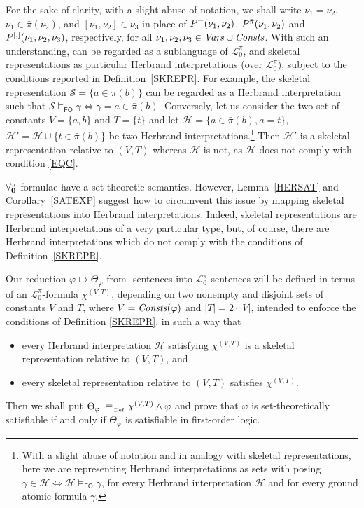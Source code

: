 \documentclass[a4paper]{llncs}
\newcommand{\Elpizero}{\ensuremath{\mathcal{L}_{0}^{\pi}}\xspace}
\newcommand{\nonpairssym}{\bar{\pi}}
\newcommand{\nonpairs}[1]{\nonpairssym(#1)}
\newcommand{\nonpairin}[2]{#1 \in \bar{\pi}(#2)}
\newcommand{\seteq}[2]{#1=#2}
\newcommand{\atset}{\mathcal{S}}
\newcommand{\consta}{a}
\newcommand{\constb}{b}
\newcommand{\hinter}{\ensuremath{\mathcal{H}}}
\newcommand{\fomodels}[2]{#1 \models_{\mathsf{FO}} #2}
\begin{document}
For the sake of clarity, with a slight abuse of notation, we shall
write $\nu_1=\nu_2$, $\nu_1 \in \nonpairs{\nu_2}$, and $[\nu_1, \nu_2]
\in \nu_3$ in place of $P^{=}(\nu_1, \nu_2)$, $P^{\bar{\pi}}(\nu_1,
\nu_2)$ and $P^{[,]}(\nu_1, \nu_2, \nu_3)$, respectively, for all
$\nu_1,\nu_2,\nu_3 \in \mathit{Vars} \cup \mathit{Consts}$.  With such an
understanding, \Forallpizero can be regarded as a sublanguage of
$\Elpizero$, and skeletal representations as particular Herbrand 
interpretations (over \Elpizero), subject to the conditions reported 
in Definition~\ref{SKREPR}. For example, the skeletal
representation 
$\atset=\{ \nonpairin{\consta}{\constb} \}$ can be regarded as 
a Herbrand interpretation such that $\fomodels{\atset}{\gamma} \iff
\gamma=\nonpairin{\consta}{\constb}$. Conversely, let us consider
the two set of constants $V=\{\consta, \constb\}$ and $T=\{t\}$
and let $\hinter=\{\nonpairin{\consta}{\constb}, \seteq{\consta}{t}\}$,
$\hinter'=\hinter \cup \{\nonpairin{t}{\constb}\}$ be two
Herbrand interpretations.\footnote{With a slight abuse of notation and in
analogy with skeletal representations, here we are representing Herbrand interpretations
as sets with posing $\gamma \in \hinter \iff \fomodels{\hinter}{\gamma}$,
for every Herbrand interpretation $\hinter$ and for every ground atomic formula
$\gamma$.} Then $\hinter'$ is a skeletal representation relative to $(V,T)$
whereas $\hinter$ is not, as $\hinter$ does not comply with condition
\ref{EQC}.


$\mathbf{\forall_{0}^{\pi}}$-formulae have a set-theoretic semantics.  However, 
Lemma~\ref{HERSAT} and Corollary~\ref{SATEXP} suggest how to 
circumvent this issue by mapping skeletal representations into 
Herbrand interpretations. Indeed, skeletal representations are 
Herbrand interpretations of a very particular type, but, of course, 
there are Herbrand interpretations which do not comply with the 
conditions of Definition~\ref{SKREPR}.

Our reduction $\varphi \mapsto \Theta_{\varphi}$ from 
\Forallpizero-sentences into \Elpizero-sentences will be defined in 
terms of an \Elpizero-formula $\chi^{(V,T)}$, depending on two 
nonempty and disjoint sets of constants $V$ and $T$, where $V = 
\mathit{Consts}(\varphi)$ and $|T| = 2 \cdot |V|$, intended to enforce the 
conditions of Definition \ref{SKREPR}, in such a way that
\begin{itemize}
  \item every Herbrand interpretation $\hinter$ satisfying $\chi^{(V,T)}$
  is a skeletal representation relative to $(V,T)$, and
  \item every skeletal representation relative to $(V,T)$
  satisfies $\chi^{(V,T)}$.
\end{itemize}
Then we shall put $\Theta_{\varphi} \equivAs\, \chi^{(V,T)} \wedge 
\varphi$ and prove that $\varphi$ is set-theoretically satisfiable if 
and only if $\Theta_{\varphi}$ is satisfiable in first-order logic.
\end{document}
